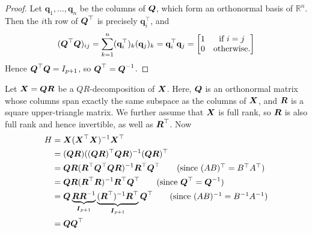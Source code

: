 \documentclass[12pt]{article}
\begin{document}
\begin{enumerate}

\begin{proof}
	Let $\mathbf{q}_1,\ldots,\mathbf{q}_n$ be the columns of $\boldsymbol{Q}$, which form
	an orthonormal basis of $\mathbb{R}^n$. Then the $i$th row of
	$\boldsymbol{Q}^\top$ is precisely $\mathbf{q}_i^\top$, and
	\begin{align*}
		(\boldsymbol{Q}^\top \boldsymbol{Q})_{ij}
		=\sum_{k=1}^{n}(\mathbf{q}_i^\top)_k (\mathbf{q}_j)_k
		=\mathbf{q}_i^\top \mathbf{q}_j=\begin{bmatrix}
			1 & \text{if }i = j\\
			0 & \text{otherwise}.
		\end{bmatrix}
	\end{align*}
	Hence $\boldsymbol{Q}^\top \boldsymbol{Q} = I_{p+1}$, so $\boldsymbol{Q}^\top=\boldsymbol{Q}^{-1}$.
\end{proof}



Let $\boldsymbol{X}=\boldsymbol{Q}\boldsymbol{R}$ be a $QR$-decomposition of $\boldsymbol{X}$. Here, $\boldsymbol{Q}$ is an orthonormal matrix
whose columns span exactly the same subspace as the columns of $\boldsymbol{X}$, and $\boldsymbol{R}$ is a square
upper-triangle matrix. We further assume that $\boldsymbol{X}$ is full rank, so $\boldsymbol{R}$ is also full rank
and hence invertible, as well as $\boldsymbol{R}^\top$. Now
\begin{align*}
	H&=\X(\X^\top \X)^{-1}\X^\top\\
	&=(\Q\R)((\Q\R)^\top \Q\R)^{-1}(\Q\R)^\top\\
	&=\Q\R(\R^\top \Q^\top \Q \R)^{-1}\R^\top \Q^\top
	\tag{since $(AB)^\top=B^\top A^\top$}\\
	&=\Q\R(\R^\top \R)^{-1}\R^\top \Q^\top
	\tag{since $\Q^\top=\Q^{-1}$}\\
	&=\Q\underbrace{\R\R^{-1}}_{\I_{p+1}}\underbrace{(\R^\top)^{-1}\R^\top}_{\I_{p+1}} \Q^\top
	\tag{since $(AB)^{-1}=B^{-1} A^{-1}$}\\
	&=\Q \Q^\top
\end{align*}




\end{enumerate}
\end{document}
